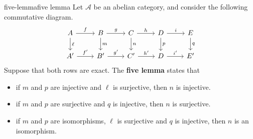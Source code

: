 \begin{topic}{five-lemma}{five lemma}
    Let $\mathcal{A}$ be an abelian category, and consider the following commutative diagram.
    \[ \begin{tikzcd} A \arrow{r}{f} \arrow{d}{\ell} & B \arrow{r}{g} \arrow{d}{m} & C \arrow{r}{h} \arrow{d}{n} & D \arrow{r}{i} \arrow{d}{p} & E \arrow{d}{q} \\ A' \arrow{r}{f'} & B' \arrow{r}{g'} & C' \arrow{r}{h'} & D \arrow{r}{i'} & E' \end{tikzcd} \]
    Suppose that both rows are exact. The \textbf{five lemma} states that
    \begin{itemize}
        \item if $m$ and $p$ are injective and $\ell$ is surjective, then $n$ is injective.
        
        \item if $m$ and $p$ are surjective and $q$ is injective, then $n$ is surjective.
        
        \item if $m$ and $p$ are isomorphisms, $\ell$ is surjective and $q$ is injective, then $n$ is an isomorphism.
    \end{itemize}
\end{topic}
